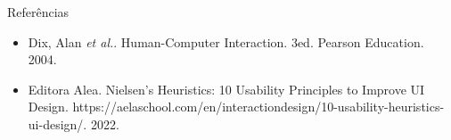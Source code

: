 \documentclass[11pt]{beamer}
\begin{document}
    \begin{frame}{Referências}
      \begin{itemize}
        \item Dix, Alan \textit{et al.}. Human-Computer Interaction. 3ed. Pearson Education. 2004.
        \item Editora Alea. Nielsen's Heuristics: 10 Usability Principles to Improve UI Design. https://aelaschool.com/en/interactiondesign/10-usability-heuristics-ui-design/. 2022.
      \end{itemize}
    \end{frame}    
\end{document}
